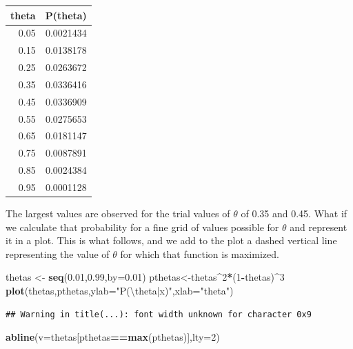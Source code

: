 \documentclass[
]{book}
\newenvironment{Shaded}{\begin{snugshade}}{\end{snugshade}}
\newcommand{\CharTok}[1]{\textcolor[rgb]{0.31,0.60,0.02}{#1}}
\newcommand{\DataTypeTok}[1]{\textcolor[rgb]{0.13,0.29,0.53}{#1}}
\newcommand{\DecValTok}[1]{\textcolor[rgb]{0.00,0.00,0.81}{#1}}
\newcommand{\FloatTok}[1]{\textcolor[rgb]{0.00,0.00,0.81}{#1}}
\newcommand{\KeywordTok}[1]{\textcolor[rgb]{0.13,0.29,0.53}{\textbf{#1}}}
\newcommand{\NormalTok}[1]{#1}
\newcommand{\OperatorTok}[1]{\textcolor[rgb]{0.81,0.36,0.00}{\textbf{#1}}}
\newcommand{\StringTok}[1]{\textcolor[rgb]{0.31,0.60,0.02}{#1}}
\begin{document}
\begin{tabular}{r|r}
\hline
theta & P(theta)\\
\hline
0.05 & 0.0021434\\
\hline
0.15 & 0.0138178\\
\hline
0.25 & 0.0263672\\
\hline
0.35 & 0.0336416\\
\hline
0.45 & 0.0336909\\
\hline
0.55 & 0.0275653\\
\hline
0.65 & 0.0181147\\
\hline
0.75 & 0.0087891\\
\hline
0.85 & 0.0024384\\
\hline
0.95 & 0.0001128\\
\hline
\end{tabular}

The largest values are observed for the trial values of \(\theta\) of 0.35 and 0.45. What if we calculate that probability for a fine grid of values possible for \(\theta\) and represent it in a plot. This is what follows, and we add to the plot a dashed vertical line representing the value of \(\theta\) for which that function is maximized.

\begin{Shaded}
\begin{Highlighting}[]
\NormalTok{thetas <-}\StringTok{ }\KeywordTok{seq}\NormalTok{(}\FloatTok{0.01}\NormalTok{,}\FloatTok{0.99}\NormalTok{,}\DataTypeTok{by=}\FloatTok{0.01}\NormalTok{)}
\NormalTok{pthetas<-thetas}\OperatorTok{^}\DecValTok{2}\OperatorTok{*}\NormalTok{(}\DecValTok{1}\OperatorTok{-}\NormalTok{thetas)}\OperatorTok{^}\DecValTok{3}
\KeywordTok{plot}\NormalTok{(thetas,pthetas,}\DataTypeTok{ylab=}\StringTok{"P(}\CharTok{\textbackslash{}t}\StringTok{heta|x)"}\NormalTok{,}\DataTypeTok{xlab=}\StringTok{"theta"}\NormalTok{)}
\end{Highlighting}
\end{Shaded}

\begin{verbatim}
## Warning in title(...): font width unknown for character 0x9
\end{verbatim}

\begin{Shaded}
\begin{Highlighting}[]
\KeywordTok{abline}\NormalTok{(}\DataTypeTok{v=}\NormalTok{thetas[pthetas}\OperatorTok{==}\KeywordTok{max}\NormalTok{(pthetas)],}\DataTypeTok{lty=}\DecValTok{2}\NormalTok{)}
\end{Highlighting}
\end{Shaded}
\end{document}
